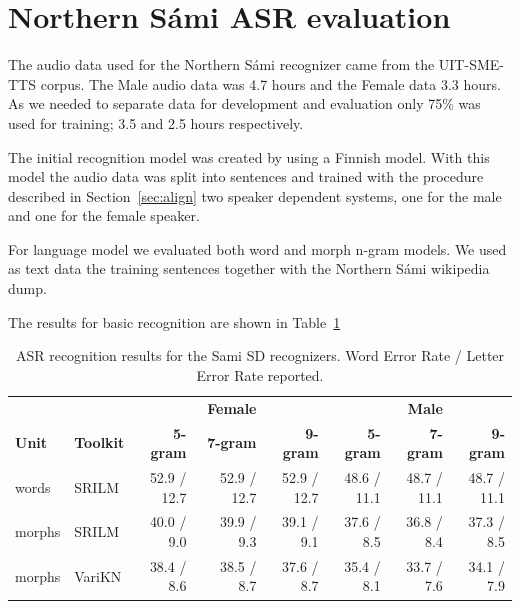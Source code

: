 \documentclass[b5paper]{article}
\newcommand{\ns}{{Northern Sámi }}
\begin{document}



%
%





\section{\ns ASR evaluation} 
The audio data used for the \ns recognizer came from the UIT-SME-TTS corpus. The Male audio data was 4.7 hours and the Female data 3.3 hours. As we needed to separate data for development and evaluation only 75\% was used for training; 3.5 and 2.5 hours respectively.

The initial recognition model was created by using a Finnish model. With this model the audio data was split into sentences and trained with the procedure described in Section~\ref{sec:align} two speaker dependent systems, one for the male and one for the female speaker. 

For language model we evaluated both word and morph n-gram models. We used as text data the training sentences together with the \ns wikipedia dump.

The results for basic recognition are shown in Table~\ref{tbl:samibasic}

\begin{table}[!h]
\centering
\begin{tabular}{ll|rrr|rrr}
& & & \textbf{Female} & & & \textbf{Male} & \\
 \textbf{Unit} & \textbf{Toolkit} & \textbf{5-gram} & \textbf{7-gram} & \textbf{9-gram} & \textbf{5-gram} & \textbf{7-gram} & \textbf{9-gram}\\\hline
 words & SRILM & 52.9 / 12.7 & 52.9 / 12.7& 52.9 / 12.7&48.6 / 11.1 & 48.7 / 11.1 & 48.7 / 11.1\\
morphs & SRILM & 40.0 /  9.0 & 39.9 / 9.3& 39.1 / 9.1 & 37.6 / 8.5 & 36.8 / 8.4 & 37.3 / 8.5 \\
 morphs & VariKN  & 38.4 / 8.6& 38.5 / 8.7  & 37.6 / 8.7 & 35.4 / 8.1 &  33.7 / 7.6 & 34.1 / 7.9 \\

\end{tabular}
\caption{ASR recognition results for the Sami SD recognizers. Word Error Rate / Letter Error Rate reported.\label{tbl:samibasic}}
\end{table}
\end{document}
